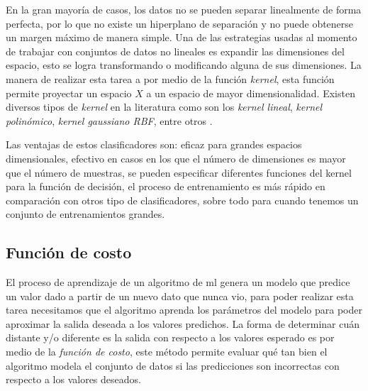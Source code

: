 En la gran mayoría de casos, los datos no se pueden separar linealmente de forma perfecta, por lo que no existe un hiperplano de separación y no puede obtenerse un margen máximo de manera simple. Una de las estrategias usadas al momento de trabajar con conjuntos de datos no lineales es expandir las dimensiones del espacio, esto se logra transformando o modificando alguna de sus dimensiones. La manera de realizar esta tarea a por medio de la función  \textit{kernel}, esta función permite proyectar un espacio $ X$ a un espacio de mayor dimensionalidad. Existen diversos tipos de \textit{kernel} en la literatura como son los \textit{kernel lineal}, \textit{kernel polinómico}, \textit{kernel gaussiano RBF}, entre otros \citep{SVM}. 


Las ventajas de estos clasificadores son: eficaz para grandes espacios dimensionales, efectivo en casos en los que el número de dimensiones es mayor que el número de muestras, se pueden especificar diferentes funciones del kernel para la función de decisión, el proceso de entrenamiento es más rápido en comparación con otros tipo de clasificadores, sobre todo para cuando tenemos un conjunto de entrenamientos grandes.

\subsection{Función de costo}\label{sub:funcion_costo}


El proceso de aprendizaje de un algoritmo de \ac{ml} genera un  modelo que predice un valor dado a partir de un nuevo dato que nunca vio, para poder realizar esta tarea necesitamos que el algoritmo aprenda los parámetros del modelo para poder aproximar la salida deseada a los valores predichos. La forma de determinar cuán distante y/o diferente es la salida con respecto a los valores esperado es por medio de la \textit{función de costo}, este método permite evaluar qué tan bien el algoritmo modela el conjunto de datos si las predicciones son incorrectas con respecto a los valores deseados. 

